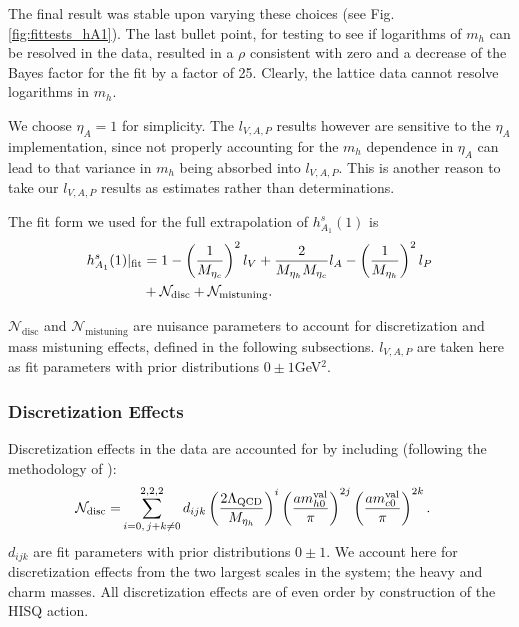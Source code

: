 The final result was stable upon varying these choices (see Fig. \ref{fig:fittests_hA1}). The last bullet point, for testing to see if logarithms of $m_h$ can be resolved in the data, resulted in a $\rho$ consistent with zero and a decrease of the Bayes factor for the fit by a factor of 25. Clearly, the lattice data cannot resolve logarithms in $m_h$.

We choose $\eta_A=1$ for simplicity. The $l_{V,A,P}$ results however are sensitive to the $\eta_A$ implementation, since not properly accounting for the $m_h$ dependence in $\eta_A$ can lead to that variance in $m_h$ being absorbed into $l_{V,A,P}$. This is another reason to take our $l_{V,A,P}$ results as estimates rather than determinations.

The fit form we used for the full extrapolation of $h_{A_1}^s(1)$ is
\begin{align}
  h^s_{A_1}(1)|_{\text{fit}} &= 1 - \left({1\over M_{\eta_c}}\right)^2 l_V + {2\over M_{\eta_h}M_{\eta_c}} l_A- \left({1\over M_{\eta_h}}\right)^2 l_P  \nonumber \\ &+ \mathcal{N}_{\text{disc}} + \mathcal{N}_{\text{mistuning}}.
  \label{eq:fitform_BsDsstar}
\end{align}

$\mathcal{N}_{\text{disc}}$ and $\mathcal{N}_{\text{mistuning}}$ are nuisance parameters to account for discretization and mass mistuning effects, defined in the following subsections. $l_{V,A,P}$ are taken here as fit parameters with prior distributions $0\pm 1 $GeV$^2$.

\subsubsection{Discretization Effects}

Discretization effects in the data are accounted for by including (following the methodology of \cite{McNeile:2012qf}):
\begin{align}
    \label{eq:fitfun_hA1}
  \mathcal{N}_{\text{disc}} = &\sum_{i=0,\,j+k\neq 0}^{2,2,2} d_{ijk} \left({2\Lambda_{\text{QCD}}\over M_{\eta_h} }\right)^{i} \left({ am^{\text{val}}_{h0} \over \pi }\right)^{2j} \left({ am^{\text{val}}_{c0} \over \pi }\right)^{2k}.
\end{align}
$d_{ijk}$ are fit parameters with prior distributions $0\pm 1$. We account here for discretization effects from the two largest scales in the system; the heavy and charm masses. All discretization effects are of even order by construction of the HISQ action.

